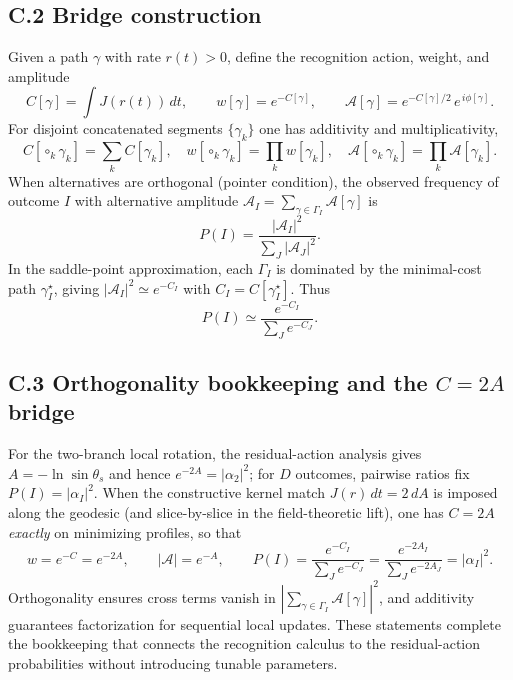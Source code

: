 \documentclass[11pt,letterpaper]{article}
\begin{document}
\subsection*{C.2 Bridge construction}

Given a path $\gamma$ with rate $r(t)>0$, define the recognition action, weight, and amplitude
\begin{equation}
C[\gamma]=\int J(r(t))\,dt,\qquad
w[\gamma]=e^{-C[\gamma]},\qquad
\mathcal A[\gamma]=e^{-C[\gamma]/2}\,e^{\,i\phi[\gamma]}.
\end{equation}
For disjoint concatenated segments $\{\gamma_k\}$ one has additivity and multiplicativity,
\begin{equation}
C[\circ_k\gamma_k]=\sum_k C[\gamma_k],\quad
w[\circ_k\gamma_k]=\prod_k w[\gamma_k],\quad
\mathcal A[\circ_k\gamma_k]=\prod_k \mathcal A[\gamma_k].
\end{equation}
When alternatives are orthogonal (pointer condition), the observed frequency of outcome $I$ with alternative amplitude $\mathcal A_I=\sum_{\gamma\in\Gamma_I}\mathcal A[\gamma]$ is
\begin{equation}
P(I)=\frac{|\mathcal A_I|^2}{\sum_J |\mathcal A_J|^2}.
\end{equation}
In the saddle-point approximation, each $\Gamma_I$ is dominated by the minimal-cost path $\gamma_I^\star$, giving $|\mathcal A_I|^2\simeq e^{-C_I}$ with $C_I=C[\gamma_I^\star]$. Thus
\begin{equation}
P(I)\simeq \frac{e^{-C_I}}{\sum_J e^{-C_J}}.
\end{equation}

\subsection*{C.3 Orthogonality bookkeeping and the $C=2A$ bridge}

For the two-branch local rotation, the residual-action analysis gives $A=-\ln\sin\theta_s$ and hence $e^{-2A}=|\alpha_2|^2$; for $D$ outcomes, pairwise ratios fix $P(I)=|\alpha_I|^2$. When the constructive kernel match $J(r)\,dt=2\,dA$ is imposed along the geodesic (and slice-by-slice in the field-theoretic lift), one has $C=2A$ \emph{exactly} on minimizing profiles, so that
\begin{equation}
w=e^{-C}=e^{-2A},\qquad
|\mathcal A|=e^{-A},\qquad
P(I)=\frac{e^{-C_I}}{\sum_J e^{-C_J}}=\frac{e^{-2A_I}}{\sum_J e^{-2A_J}}=|\alpha_I|^2.
\end{equation}
Orthogonality ensures cross terms vanish in $|\sum_{\gamma\in\Gamma_I}\mathcal A[\gamma]|^2$, and additivity guarantees factorization for sequential local updates. These statements complete the bookkeeping that connects the recognition calculus to the residual-action probabilities without introducing tunable parameters. %
\end{document}
